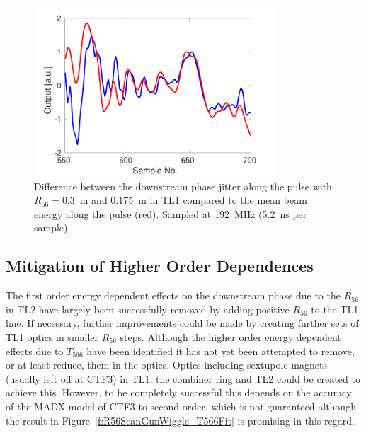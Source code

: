 \begin{figure}
  \centering
  \includegraphics[width=0.8\textwidth]{Figures/propagation/stdPhaseVsMeanEnergyAlong}
  \caption{Difference between the downstream phase jitter along the pulse with \(R_{56} = 0.3\)~m and 0.175~m in TL1 compared to the mean beam energy along the pulse (red). Sampled at 192~MHz (5.2~ns per sample).}
  \label{f:stdPhaseVsMeanEnergyAlong}
\end{figure}

\subsection{Mitigation of Higher Order Dependences}
\label{ss:t566Mitigation}

The first order energy dependent effects on the downstream phase due to the \(R_{56}\) in TL2 have largely been successfully removed by adding positive \(R_{56}\) to the TL1 line. If necessary, further improvements could be made by creating further sets of TL1 optics in smaller \(R_{56}\) steps. 
Although the higher order energy dependent effects due to \(T_{566}\) have been identified it has not yet been attempted to remove, or at least reduce, them in the optics. Optics including sextupole magnets (usually left off at CTF3) in TL1, the combiner ring and TL2 could be created to achieve this. However, to be completely successful this depends on the accuracy of the MADX model of CTF3 to second order, which is not guaranteed although the result in Figure~\ref{f:R56ScanGunWiggle_T566Fit} is promising in this regard.

